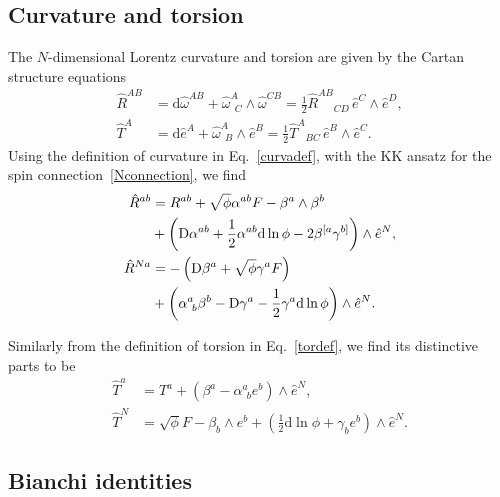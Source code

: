 \documentclass[aps,prd,12pt,superscriptaddress,showpacs,showkeys,longbibliography,reprint,nofootinbib]{revtex4-1}
\begin{document}
\subsection{Curvature and torsion}

The $N$-dimensional Lorentz curvature and torsion are given by the Cartan structure equations
\begin{align}
  \label{curvadef}
  \hat{R}^{AB} &= \mbox{d}\hat{\omega}^{AB}+\hat{\omega}^A_{\ \ C}\wedge\hat{\omega}^{CB} = \frac{1}{2} \hat{R}^{AB}{}_{CD} \, \hat{e}^C \wedge \hat{e}^D,\\
  \label{tordef}
  \hat{T}^A &= \mbox{d}\hat{e}^A+\hat{\omega}^A_{\ \ B}\wedge\hat{e}^B = \frac{1}{2} \hat{T}^{A}{}_{BC} \, \hat{e}^B \wedge \hat{e}^C. 
\end{align}
Using the definition of curvature in Eq.~\eqref{curvadef},  with the KK ansatz for the spin connection~\eqref{Nconnection}, we find
\begin{align}
  \label{R1}
  \hat{R}^{ab}&=R^{ab}+\sqrt{\phi}\alpha^{ab}F-\beta^a\wedge\beta^b\notag\\
  &+\left(\mbox{D}\alpha^{ab}+\frac{1}{2}\alpha^{ab}\mbox{d}\ln\phi-2\beta^{[a}\gamma^{b]}\right)\wedge\hat{e}^N,\\
  \label{R2}
  \hat{R}^{Na}&=-\left(\mbox{D}\beta^a+\sqrt{\phi}\gamma^a F\right)\notag\\
  &+\left(\alpha^a_{\ b}\beta^b-\mbox{D}\gamma^a-\frac{1}{2}\gamma^a\mbox{d}\ln\phi\right)\wedge\hat{e}^N.
\end{align}

Similarly from the definition of torsion in Eq.~\eqref{tordef}, we find its distinctive parts to be
\begin{align}\label{T1}
  \hat{T}^a &= T^a+\left(\beta^a-\alpha^a_{\ \ b}e^b\right)\wedge\hat{e}^N,\\
  \label{T2}
  \hat{T}^N &= \sqrt{\phi}F-\beta_b\wedge e^b+\left(\frac{1}{2}\mbox{d}\ln\phi+\gamma_be^b\right)\wedge\hat{e}^N.
\end{align}

\subsection{Bianchi identities}
\end{document}
